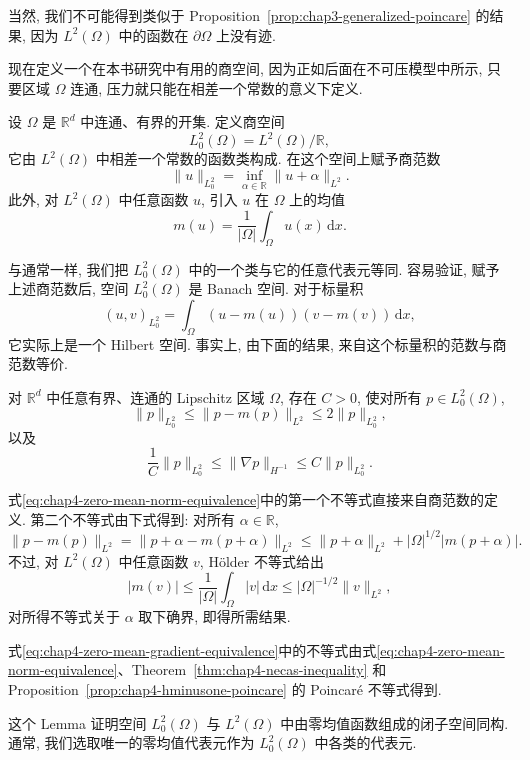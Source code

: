 当然, 我们不可能得到类似于 Proposition~\ref{prop:chap3-generalized-poincare} 的结果, 因为 $L^2(\Omega)$ 中的函数在 $\partial\Omega$ 上没有迹.

现在定义一个在本书研究中有用的商空间, 因为正如后面在不可压模型中所示, 只要区域 $\Omega$ 连通, 压力就只能在相差一个常数的意义下定义.

\begin{Definition}
\label{def:chap4-zero-mean-quotient-space}
设 $\Omega$ 是 $\mathbb R^d$ 中连通、有界的开集. 定义商空间
\[
 L_0^2(\Omega)=L^2(\Omega)/\mathbb R,
\]
它由 $L^2(\Omega)$ 中相差一个常数的函数类构成. 在这个空间上赋予商范数
\[
 \|u\|_{L_0^2}=\inf_{\alpha\in\mathbb R}\|u+\alpha\|_{L^2}.
\]
此外, 对 $L^2(\Omega)$ 中任意函数 $u$, 引入 $u$ 在 $\Omega$ 上的均值
\[
 m(u)=\frac1{|\Omega|}\int_\Omega u(x)\,\mathrm dx.
\]
\end{Definition}

与通常一样, 我们把 $L_0^2(\Omega)$ 中的一个类与它的任意代表元等同. 容易验证, 赋予上述商范数后, 空间 $L_0^2(\Omega)$ 是 Banach 空间. 对于标量积
\[
 (u,v)_{L_0^2}=\int_\Omega(u-m(u))(v-m(v))\,\mathrm dx,
\]
它实际上是一个 Hilbert 空间. 事实上, 由下面的结果, 来自这个标量积的范数与商范数等价.

\begin{Lemma}
\label{lem:chap4-zero-mean-quotient-equivalence}
对 $\mathbb R^d$ 中任意有界、连通的 Lipschitz 区域 $\Omega$, 存在 $C>0$, 使对所有 $p\in L_0^2(\Omega)$,
\begin{equation}
 \|p\|_{L_0^2}\leq\|p-m(p)\|_{L^2}\leq2\|p\|_{L_0^2},
 \label{eq:chap4-zero-mean-norm-equivalence}
\end{equation}
以及
\begin{equation}
 \frac1C\|p\|_{L_0^2}\leq\|\nabla p\|_{H^{-1}}
 \leq C\|p\|_{L_0^2}.
 \label{eq:chap4-zero-mean-gradient-equivalence}
\end{equation}
\end{Lemma}

\begin{Proof}
式\eqref{eq:chap4-zero-mean-norm-equivalence}中的第一个不等式直接来自商范数的定义. 第二个不等式由下式得到: 对所有 $\alpha\in\mathbb R$,
\[
 \|p-m(p)\|_{L^2}
 =\|p+\alpha-m(p+\alpha)\|_{L^2}
 \leq\|p+\alpha\|_{L^2}+|\Omega|^{1/2}|m(p+\alpha)|.
\]
不过, 对 $L^2(\Omega)$ 中任意函数 $v$, H\"older 不等式给出
\[
 |m(v)|\leq\frac1{|\Omega|}\int_\Omega|v|\,\mathrm dx
 \leq|\Omega|^{-1/2}\|v\|_{L^2},
\]
对所得不等式关于 $\alpha$ 取下确界, 即得所需结果.

式\eqref{eq:chap4-zero-mean-gradient-equivalence}中的不等式由式\eqref{eq:chap4-zero-mean-norm-equivalence}、Theorem~\ref{thm:chap4-necas-inequality} 和 Proposition~\ref{prop:chap4-hminusone-poincare} 的 Poincar\'e 不等式得到.
\end{Proof}

这个 Lemma 证明空间 $L_0^2(\Omega)$ 与 $L^2(\Omega)$ 中由零均值函数组成的闭子空间同构. 通常, 我们选取唯一的零均值代表元作为 $L_0^2(\Omega)$ 中各类的代表元.
